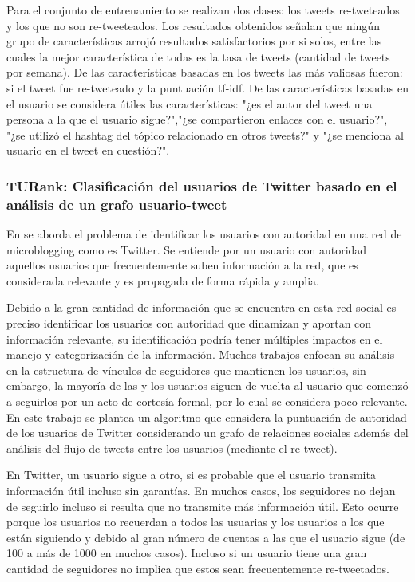 Para el conjunto de entrenamiento se realizan dos clases: los tweets re-tweteados y los que no son re-tweeteados. Los resultados obtenidos señalan que ningún grupo de características arrojó resultados satisfactorios por si solos, entre las cuales la mejor característica de todas es la tasa de tweets (cantidad de tweets por semana). De las características basadas en los tweets las más valiosas fueron: si el tweet fue re-tweteado y la puntuación tf-idf. De las características basadas en  el usuario se considera útiles las características: "¿es el autor del tweet una persona a la que el usuario sigue?","¿se compartieron enlaces con el usuario?", "¿se utilizó el hashtag del tópico relacionado en otros tweets?" y "¿se menciona al usuario en el tweet en cuestión?".

\subsubsection{TURank: Clasificación del usuarios de Twitter basado en el análisis de un grafo usuario-tweet}

 En \cite{Yamaguchi:2010:TTU:1991336.1991364} se aborda el problema de identificar los usuarios con autoridad en una red de microblogging como es Twitter. Se entiende por un usuario con autoridad aquellos usuarios que frecuentemente suben información a la red, que es considerada relevante y es propagada de forma rápida y amplia.
 
 Debido a la gran cantidad de información que se encuentra en esta red social es preciso identificar los usuarios con autoridad que dinamizan y aportan con información relevante, su identificación podría tener múltiples impactos en el manejo y categorización de la información. Muchos trabajos enfocan su análisis en la estructura de vínculos de seguidores que mantienen los usuarios, sin embargo, la mayoría de las y los usuarios siguen de vuelta al usuario que comenzó a seguirlos por un acto de cortesía formal, por lo cual se considera poco relevante. En este trabajo se plantea un algoritmo que considera la puntuación de autoridad de los usuarios de Twitter considerando un grafo de relaciones sociales además del análisis del flujo de tweets entre los usuarios (mediante el re-tweet).

En Twitter, un usuario sigue a otro, si es probable que el usuario transmita información útil incluso sin garantías. En muchos casos, los seguidores no dejan de seguirlo incluso si resulta que no transmite  más información útil. Esto ocurre porque los usuarios no recuerdan a todos las usuarias y los usuarios a los que están siguiendo y debido al gran número de cuentas a las que el usuario sigue (de 100 a más de 1000 en muchos casos). Incluso si un usuario tiene una gran cantidad de seguidores no implica que estos sean frecuentemente re-tweetados.

